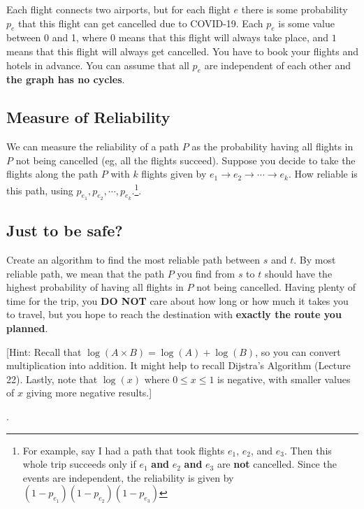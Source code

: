 \documentclass [12pt]{article}
\begin{document}
Each flight connects two airports, but for each flight $e$ there is some probability $p_e$ that this flight can get cancelled due to COVID-19. Each $p_e$ is some value between 0 and 1, where $0$ means that this flight will always take place, and $1$ means that this flight will always get cancelled. You have to book your flights and hotels in advance. You can assume that all $p_e$ are independent of each other and \textbf{the graph has no cycles}. 


\subsection{Measure of Reliability } 
We can measure the reliability of a path $P$ as the probability having all flights in $P$ not being cancelled (eg, all the flights succeed). Suppose you decide to take the flights along the path $P$ with $k$ flights given by $e_1 \to e_2 \to \cdots \to e_k$. How reliable is this path, using $p_{e_1}, p_{e_2}, \cdots, p_{e_k}$.\footnote{For example, say I had a path that took flights $e_1$, $e_2$, and $e_3$. Then this whole trip succeeds only if $e_1$ \textbf{and} $e_2$ \textbf{and} $e_3$ are \textbf{not} cancelled. Since the events are independent, the reliability is given by $(1-p_{e_1})(1-p_{e_2})(1-p_{e_3})$}.


\subsection {Just to be safe? } 
Create an algorithm to find the most reliable path between $s$ and $t$. By most reliable path, we mean that the path $P$ you find from $s$ to $t$ should have the highest probability of having all flights in $P$ not being cancelled. Having plenty of time for the trip, you \textbf {DO NOT} care about how long or how much it takes you to travel, but you hope to reach the destination with \textbf{exactly the route you planned}. 

[Hint: Recall that $\log(A \times B) = \log(A) + \log(B)$, so you can convert multiplication into addition. It might help to recall Dijstra's Algorithm (Lecture 22). Lastly, note that $\log(x)$ where $0 \leq x \leq 1$ is negative, with smaller values of $x$ giving more negative results.]


.
\end{document}
